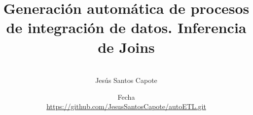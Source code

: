 \documentclass[12pt,oneside]{uhthesis}
\title{Generación automática de procesos de integración de datos. Inferencia de Joins}
\author{\\\vspace{0.25cm}Jes\'us Santos Capote}
\date{Fecha\\\vspace{0.25cm}\href{https://github.com/username/repo}{https://github.com/JesusSantosCapote/autoETL.git}}
\begin{document}
\frontmatter
\maketitle







\mainmatter
























\nocite{powercenter1}

\backmatter





\end{document}
